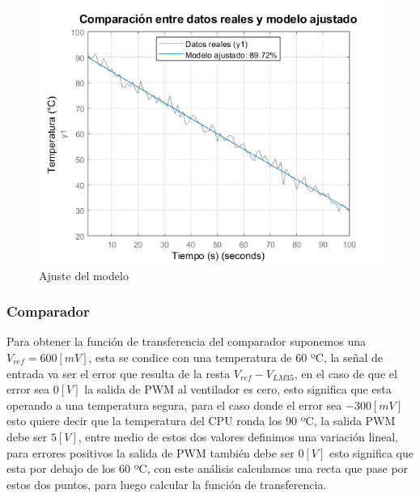 \documentclass[12pt]{article}
\begin{document}
		\begin{figure}[h!]
			\includegraphics{Imagenes/Ajuste_modelo}
			\caption[Ajuste del modelo]{Ajuste del modelo}
			\label{fig:ajustemodelo}
		\end{figure}
	
		\subsubsection{Comparador}
		Para obtener la función de transferencia del comparador suponemos una $V_{ref}=600[mV]$, esta se condice con una temperatura de 60 ºC, la señal de entrada va ser el error que resulta de la resta $V_{ref}-V_{LM35}$, en el caso de que el error sea $0[V]$ la salida de PWM al ventilador es cero, esto significa que esta operando a una temperatura segura, para el caso donde el error sea $-300[mV]$ esto quiere decir que la temperatura del CPU ronda los 90 ºC, la salida PWM debe ser $5[V]$, entre medio de estos dos valores definimos una variación lineal, para errores positivos la salida de PWM también debe ser $0[V]$ esto significa que esta por debajo de los 60 ºC, con este análisis calculamos una recta que pase por estos dos puntos, para luego calcular la función de transferencia.\newpage
	
\end{document}
